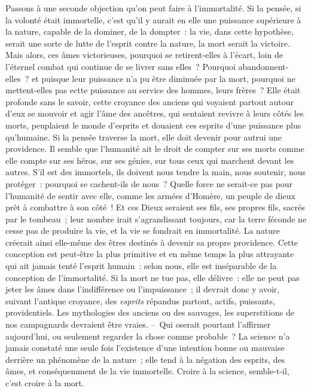 \documentclass[french,twoside]{book} %
\begin{document}
Passons à une seconde objection qu’on peut faire à l’immortalité. Si la pensée, si la volonté était immortelle, c’est qu’il y aurait en elle une puissance supérieure à la nature, capable de la dominer, de la dompter : la vie, dans cette hypothèse, serait une sorte de lutte de l’esprit contre la nature, la mort serait la victoire. Mais alors, ces âmes victorieuses, pourquoi se retirent-elles à l’écart, loin de l’éternel combat qui continue de se livrer sans elles ? Pourquoi abandonnent-elles ? et puisque leur puissance n’a pu être diminuée par la mort, pourquoi ne mettent-elles pas ectte puissance au service des hommes, leurs frères ? Elle était profonde sans le savoir, cette croyance des anciens qui voyaient partout autour d’eux se mouvoir et agir l’âme des ancêtres, qui sentaient revivre à leurs côtés les morts, peuplaient le monde d’esprits et douaient ces esprits d’une puissance plus qu’humaine. Si la pensée traverse la mort, elle doit devenir pour autrui une providence. Il semble que l’humanité ait le droit de compter sur ses morts comme elle compte sur ses héros, sur ses génies, sur tous ceux qui marchent devant les autres. S’il est des immortels, ils doivent nous tendre la main, nous soutenir, nous protéger : pourquoi se cachent-ils de nous ? Quelle force ne serait-ce pas pour l’humanité de sentir avec elle, comme les armées d’Homère, un peuple de dieux prêt à combattre à son côté ! Et ces Dieux seraient ses fils, ses propres fils, sacrés par le tombeau ; leur nombre irait s’agrandissant toujours, car la terre féconde ne cesse pas de produire la vie, et la vie se fondrait en immortalité. La nature créerait ainsi elle-même des êtres destinés à devenir sa propre providence. Cette conception est peut-être la plus primitive et en même temps la plus attrayante qui ait jamais tenté l’esprit humain : selon nous, elle est inséparable de la conception de l’immortalité. Si la mort ne tue pas, elle délivre : elle ne peut pas jeter les âmes dans l’indifférence ou l’impuissance ; il devrait donc y avoir, suivant l’antique croyance, des \emph{esprits} répandus partout, actifs, puissants, providentiels. Les mythologies des anciens ou des sauvages, les superstitions de nos campagnards devraient être vraies. – Qui oserait pourtant l’affirmer aujourd’hui, ou seulement regarder la chose comme probable ? La science n’a jamais constaté une seule fois l’existence d’une intention bonne ou mauvaise derrière un phénomène de la nature ; elle tend à la négation des esprits, des âmes, et conséquemment de la vie immortelle. Croire à la science, semble-t-il, c’est croire à la mort.\par
\end{document}
